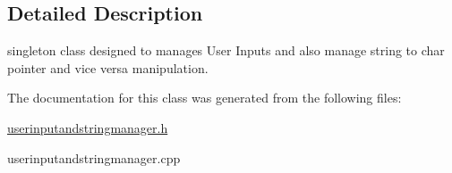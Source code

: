 \subsection{Detailed Description}
singleton class designed to manages User Inputs and also manage string to char pointer and vice versa manipulation. 

The documentation for this class was generated from the following files\+:\begin{DoxyCompactItemize}
\item 
\hyperlink{userinputandstringmanager_8h}{userinputandstringmanager.\+h}\item 
userinputandstringmanager.\+cpp\end{DoxyCompactItemize}
